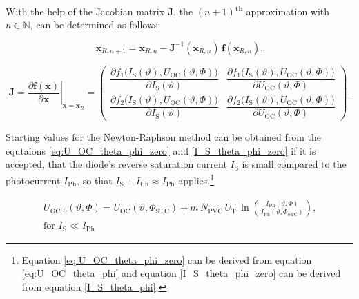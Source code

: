 With the help of the Jacobian matrix $\mathrm{\mathbf{J}}$, the $\left(n + 1\right)$\textsuperscript{th} approximation with $n \in \mathbb{N}$, can be determined as follows:
\begin{center}
	\begin{equation} \label{eq:vect_U_I_approx}
		\mathrm{\mathbf{x}}_{R, n + 1} = \mathrm{\mathbf{x}}_{R,n} 	- \mathrm{\mathbf{J}}^{-1}\left( \mathrm{\mathbf{x}}_{R,n} \right) \, \mathrm{\mathbf{f}}\left( \mathrm{\mathbf{x}}_{R,n} \right) \text{,}
	\end{equation}
\end{center}
\begin{center}
	\begin{equation} \label{eq:jacobian_for_PVG}
		\mathrm{\mathbf{J}} = \left. \dfrac{\partial \mathrm{\mathbf{f}}\left(\mathrm{\mathbf{x}}\right)}{\partial \mathrm{\mathbf{x}}} \right|_{\mathrm{\mathbf{x}} = \mathrm{\mathbf{x}}_R} = 
 		\begin{pmatrix}
  			\dfrac{\partial f_1\big( I_\mathrm{S}\left(\vartheta\right), U_\mathrm{OC}\left(\vartheta,\Phi\right) \big)}{\partial I_\mathrm{S}\left(\vartheta\right)}  & \dfrac{\partial  f_1\big( I_\mathrm{S}\left(\vartheta\right), U_\mathrm{OC}\left(\vartheta,\Phi\right) \big)}{\partial U_\mathrm{OC}\left(\vartheta,\Phi\right)} \\
			\dfrac{\partial f_2\big( I_\mathrm{S}\left(\vartheta\right), U_\mathrm{OC}\left(\vartheta,\Phi\right) \big)}{\partial I_\mathrm{S}\left(\vartheta\right)} & \dfrac{\partial f_2\big( I_\mathrm{S}\left(\vartheta\right), U_\mathrm{OC}\left(\vartheta,\Phi\right) \big)}{\partial U_\mathrm{OC}\left(\vartheta,\Phi\right)} 
 		\end{pmatrix} \text{.}
 	\end{equation}
\end{center}
Starting values for the Newton-Raphson method can be obtained from the equtaions \ref{eq:U_OC_theta_phi_zero} and \ref{I_S_theta_phi_zero} if it is accepted, that the diode's reverse saturation current $I_{\mathrm{S}}$ is small compared to the photocurrent $I_{\mathrm{Ph}}$, so that $I_{\mathrm{S}} + I_{\mathrm{Ph}} \approx I_{\mathrm{Ph}}$ applies.\footnote{Equation \ref{eq:U_OC_theta_phi_zero} can be derived from equation \ref{eq:U_OC_theta_phi} and equation \ref{I_S_theta_phi_zero} can be derived from equation \ref{I_S_theta_phi}.}
\begin{center}
	\begin{equation} \label{eq:U_OC_theta_phi_zero}
		\begin{gathered}
		 U_{\mathrm{OC,0}}\left( \vartheta, \Phi \right) = U_\mathrm{OC}\left(\vartheta,\Phi_\mathrm{STC}\right) + m \, N_\mathrm{PVC} \, U_\mathrm{T} \, \ln \left( \frac{I_\mathrm{Ph}\left(\vartheta,\Phi\right)}{I_\mathrm{Ph}\left(\vartheta,\Phi_\mathrm{STC}\right)} \right) \text{,} \\ \text{for } I_\mathrm{S} \ll I_\mathrm{Ph}
		 \end{gathered}
	\end{equation}
\end{center}
